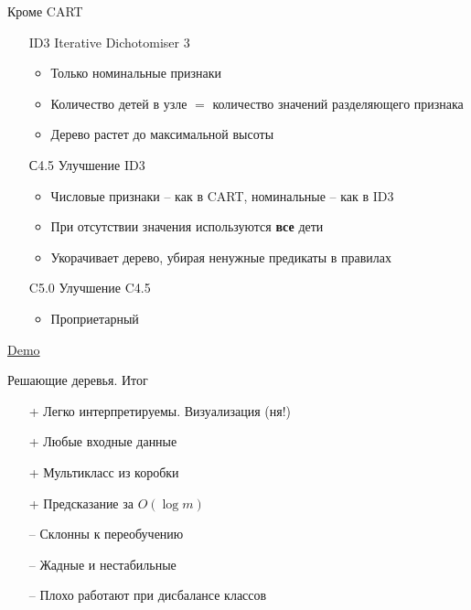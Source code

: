\documentclass[aspectratio=169]{beamer}
\begin{document}
\begin{frame}{Кроме  CART}

\begin{itemize}

\item[ID3] Iterative Dichotomiser 3
	\begin{itemize}
	\item Только номинальные признаки
	\item Количество детей в узле $=$ количество значений разделяющего признака
	\item Дерево растет до максимальной высоты
	\end{itemize}

\item[С4.5] Улучшение ID3
	\begin{itemize}
	\item Числовые признаки -- как в CART, номинальные -- как в ID3
	\item При отсутствии значения используются {\bf все} дети
	\item Укорачивает дерево, убирая ненужные предикаты в правилах
	\end{itemize}

\item[C5.0] Улучшение C4.5
	\begin{itemize}
	\item Проприетарный
	\end{itemize}

\end{itemize}

\end{frame}

\begin{frame}{\href{http://www.r2d3.us/visual-intro-to-machine-learning-part-1/}{Demo}}
\end{frame}

\begin{frame}{Решающие деревья. Итог}

\begin{itemize}
\item[+] Легко интерпретируемы. Визуализация (ня!)
\item[+] Любые входные данные
\item[+] Мультикласс из коробки
\item[+] Предсказание за $O(\log m)$
\end{itemize}

\begin{itemize}
\item[--] Склонны к переобучению
\item[--] Жадные и  нестабильные
\item[--] Плохо работают при дисбалансе классов
\end{itemize}

\end{frame}
\end{document}

